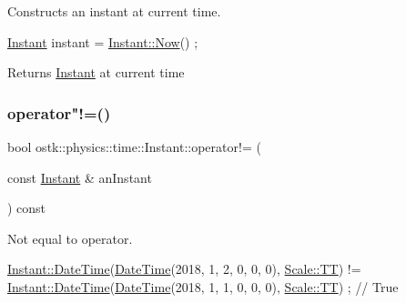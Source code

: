 Constructs an instant at current time. 


\begin{DoxyCode}
\hyperlink{classostk_1_1physics_1_1time_1_1_instant_a132c1e4b2fe9a9a671109206e297bd5d}{Instant} instant = \hyperlink{classostk_1_1physics_1_1time_1_1_instant_afbc9a9219aa94e8a828f5876ee68f42c}{Instant::Now}() ;
\end{DoxyCode}


\begin{DoxyReturn}{Returns}
\hyperlink{classostk_1_1physics_1_1time_1_1_instant}{Instant} at current time 
\end{DoxyReturn}
\mbox{\label{classostk_1_1physics_1_1time_1_1_instant_a897d758d25118001f6958c865cb6f0e2}} 
\subsubsection{\texorpdfstring{operator"!=()}{operator!=()}}
{\footnotesize\ttfamily bool ostk\+::physics\+::time\+::\+Instant\+::operator!= (\begin{DoxyParamCaption}\item[{const \hyperlink{classostk_1_1physics_1_1time_1_1_instant}{Instant} \&}]{an\+Instant }\end{DoxyParamCaption}) const}



Not equal to operator. 


\begin{DoxyCode}
\hyperlink{classostk_1_1physics_1_1time_1_1_instant_afd5725574a02389b80fad4baff313c8a}{Instant::DateTime}(\hyperlink{classostk_1_1physics_1_1time_1_1_instant_afd5725574a02389b80fad4baff313c8a}{DateTime}(2018, 1, 2, 0, 0, 0), 
      \hyperlink{namespaceostk_1_1physics_1_1time_adf23d37bd8641fb76a0e98ab46a70df7adf1f3edb9115acb0a1e04209b7a9937b}{Scale::TT}) != \hyperlink{classostk_1_1physics_1_1time_1_1_instant_afd5725574a02389b80fad4baff313c8a}{Instant::DateTime}(\hyperlink{classostk_1_1physics_1_1time_1_1_instant_afd5725574a02389b80fad4baff313c8a}{DateTime}(2018, 1, 1, 0, 0, 0), 
      \hyperlink{namespaceostk_1_1physics_1_1time_adf23d37bd8641fb76a0e98ab46a70df7adf1f3edb9115acb0a1e04209b7a9937b}{Scale::TT}) ; \textcolor{comment}{// True}
\end{DoxyCode}



